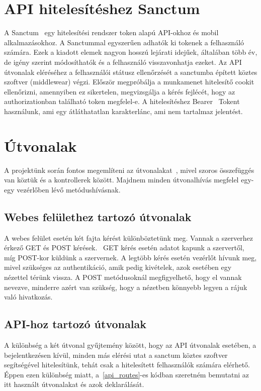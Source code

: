 \documentclass[
]{thesis-ekf}
\theoremstyle{definition}
\theoremstyle{remark}
\begin{document}
	\section{API hitelesítéshez Sanctum}
	A Sanctum~\cite{laravel_sanctum} egy hitelesítési rendszer token alapú API-okhoz és mobil alkalmazásokhoz. A Sanctummal egyszerűen adhatók ki tokenek a felhasználó számára. Ezek a kiadott elemek nagyon hosszú lejárati idejűek, általában több év, de igény szerint módosíthatók és a felhasználó visszavonhatja ezeket. Az API útvonalak eléréséhez a felhasználói státusz ellenőrzését a sanctumba épített köztes szoftver (middlewear) végzi. Először megpróbálja a munkamenet hitelesítő cookit ellenőrizni, amennyiben ez sikertelen, megvizsgálja a kérés fejlécét, hogy az authorizationban található token megfelel-e. A hitelesítéshez Bearer~\cite{bearer_token} Tokent használunk, ami egy átláthatatlan karakterlánc, ami nem tartalmaz jelentést.
	
	\section{Útvonalak}
	A projektünk során fontos megemlíteni az útvonalakat~\cite{laravel_route}, mivel szoros összefüggés van köztük és a kontrollerek között. Majdnem minden útvonalhívás megfelel egy-egy vezérlőben lévő metódushívásnak. 
	
	\subsection{Webes felülethez tartozó útvonalak}
	A webes felület esetén két fajta kérést különböztetünk meg. Vannak a szerverhez érkező GET és POST kérések.~\cite{get_post_difference} GET kérés esetén adatot kapunk a szervertől, míg POST-kor küldünk a szervernek. A legtöbb kérés esetén vezérlőt hívunk meg, mivel szükséges az authentikáció, amik pedig kivételek, azok esetében egy nézettel térünk vissza. A POST metódusoknál megfigyelhető, hogy el vannak nevezve, minderre azért van szükség, hogy a nézetben könnyebb legyen a rájuk való hivatkozás. 
	
	\subsection{API-hoz tartozó útvonalak}
	A különbség a két útvonal gyűjtemény között, hogy az API útvonalak esetében, a bejelentkezésen kívül, minden más elérési utat a sanctum köztes szoftver segítségével hitelesítünk, tehát csak a hitelesített felhasználók számára elérhető. Éppen ezen különbség miatt, a~\ref{api_routes}-es kódban szeretném bemutatni az itt használt útvonalakat és azok deklarálását.
	
\end{document}

